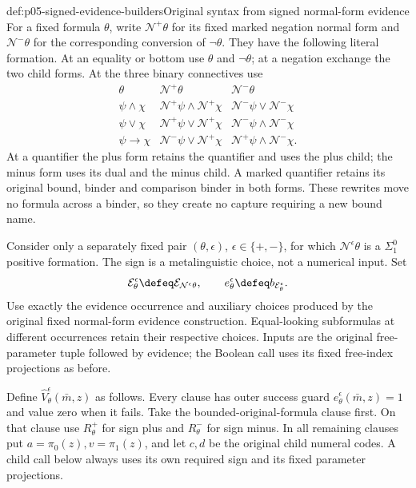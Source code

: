 \begin{hbdefinition}{def:p05-signed-evidence-builders}{Original syntax from signed normal-form evidence}
For a fixed formula \(\theta\), write \(\mathcal N^+\theta\)
for its fixed marked negation normal form and \(\mathcal N^-\theta\)
for the corresponding conversion of \(\neg\theta\). They have the
following literal formation. At an equality or bottom use \(\theta\)
and \(\neg\theta\); at a negation exchange the two child forms.
At the three binary connectives use
\[
\begin{array}{c|c|c}
 \theta&\mathcal N^+\theta&\mathcal N^-\theta\\\hline
 \psi\land\chi&\mathcal N^+\psi\land\mathcal N^+\chi
                         &\mathcal N^-\psi\lor\mathcal N^-\chi\\
 \psi\lor\chi&\mathcal N^+\psi\lor\mathcal N^+\chi
                         &\mathcal N^-\psi\land\mathcal N^-\chi\\
 \psi\to\chi&\mathcal N^-\psi\lor\mathcal N^+\chi
                         &\mathcal N^+\psi\land\mathcal N^-\chi.
\end{array}
\]
At a quantifier the plus form retains the quantifier and uses the plus
child; the minus form uses its dual and the minus child. A marked
quantifier retains its original bound, binder and comparison binder
in both forms. These rewrites move no formula across a binder, so
they create no capture requiring a new bound name.

Consider only a separately fixed pair \((\theta,\epsilon)\),
\(\epsilon\in\{+,-\}\), for which
\(\mathcal N^\epsilon\theta\) is a \(\Sigma^0_1\) positive
formation. The sign is a metalinguistic choice, not a numerical input.
Set
\[
 \mathcal E_\theta^\epsilon\defeq
       \mathcal E_{\mathcal N^\epsilon\theta},\qquad
 e_\theta^\epsilon\defeq b_{\mathcal E_\theta^\epsilon}.
\]
Use exactly the evidence occurrence and auxiliary choices produced by
the original fixed normal-form evidence construction. Equal-looking
subformulas at different occurrences retain their respective choices.
Inputs are the original free-parameter tuple followed by evidence;
the Boolean call uses its fixed free-index projections as before.

Define \(\widehat V_\theta^\epsilon(\bar m,z)\) as follows.
Every clause has outer success guard \(e_\theta^\epsilon(\bar m,z)=1\)
and value zero when it fails. Take the bounded-original-formula clause
first. On that clause use \(R_\theta^+\) for sign plus and
\(R_\theta^-\) for sign minus. In all remaining clauses put
\(a=\pi_0(z),v=\pi_1(z)\), and let \(c,d\) be the original
child numeral codes. A child call below always uses its own required
sign and its fixed parameter projections.


\end{hbdefinition}
